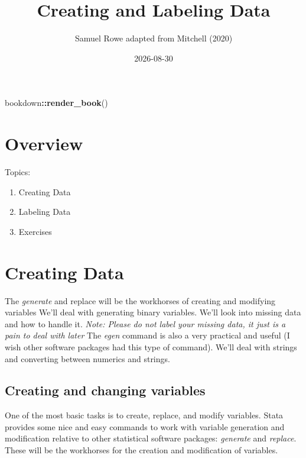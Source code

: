 \documentclass[
]{book}
\title{Creating and Labeling Data}
\author{Samuel Rowe adapted from Mitchell (2020)}
\date{2026-08-30}
\newenvironment{Shaded}{\begin{snugshade}}{\end{snugshade}}
\newcommand{\FunctionTok}[1]{\textcolor[rgb]{0.13,0.29,0.53}{\textbf{#1}}}
\newcommand{\NormalTok}[1]{#1}
\newcommand{\SpecialCharTok}[1]{\textcolor[rgb]{0.81,0.36,0.00}{\textbf{#1}}}
\providecommand{\tightlist}{%
  \setlength{\itemsep}{0pt}\setlength{\parskip}{0pt}}
\begin{document}
\maketitle

{
\setcounter{tocdepth}{1}
\tableofcontents
}
\begin{Shaded}
\begin{Highlighting}[]
\NormalTok{bookdown}\SpecialCharTok{::}\FunctionTok{render\_book}\NormalTok{()}
\end{Highlighting}
\end{Shaded}

\chapter*{Overview}\label{overview}

Topics:

\begin{enumerate}
\def\labelenumi{\arabic{enumi}.}
\tightlist
\item
  Creating Data
\item
  Labeling Data
\item
  Exercises
\end{enumerate}

\chapter{Creating Data}\label{creating-data}

The \emph{generate} and replace will be the workhorses of creating and modifying variables
We'll deal with generating binary variables. We'll look into missing data and how to handle it. \emph{Note: Please do not label your missing data, it just is a pain to deal with later}
The \emph{egen} command is also a very practical and useful (I wish other software
packages had this type of command). We'll deal with strings and converting between numerics and strings.

\section{Creating and changing variables}\label{creating-and-changing-variables}

One of the most basic tasks is to create, replace, and modify variables. Stata provides some nice and easy commands to work with variable generation and modification relative to other statistical software packages: \emph{generate} and \emph{replace}. These will be the workhorses for the creation and modification of variables.
\end{document}
